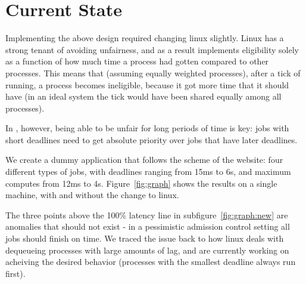 \section{Current State}

Implementing the above design required changing linux slightly. Linux has a
strong tenant of avoiding unfairness, and as a result implements eligibility
solely as a function of how much time a process had gotten compared to other
processes. This means that (assuming equally weighted processes), after a tick
of running, a process becomes ineligible, because it got more time that it
should have (in an ideal system the tick would have been shared equally among
all processes).

In \sysname, however, being able to be unfair for long periods of time is key:
jobs with short deadlines need to get absolute priority over jobs that have
later deadlines.

We create a dummy application that follows the scheme of the website: four
different types of jobs, with deadlines ranging from 15ms to 6s, and maximum
computes from 12ms to 4s. Figure~\ref{fig:graph} shows the results on a single
machine, with and without the change to linux. 

The three points above the 100$\%$ latency line in subfigure~\ref{fig:graph:new}
are anomalies that should not exist - in a pessimistic admission control setting
all jobs should finish on time. We traced the issue back to how linux deals with
dequeueing processes with large amounts of lag, and are currently working on
acheiving the desired behavior (processes with the smallest deadline always run
first).